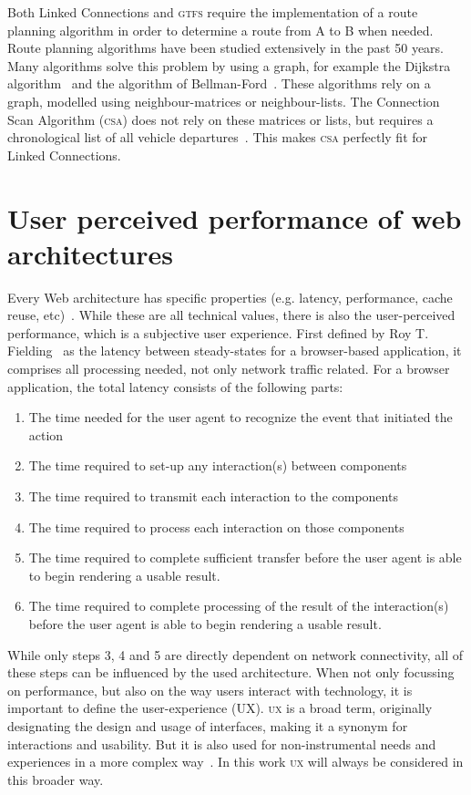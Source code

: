 \documentclass[twocolumn]{phdsymp} %
\begin{document}
Both Linked Connections and \textsc{gtfs} require the implementation of a route planning algorithm in order to determine a route from A to B when needed. Route planning algorithms have been studied extensively in the past 50 years. Many algorithms solve this problem by using a graph, for example the Dijkstra algorithm~\cite{dijkstra} and the algorithm of Bellman-Ford~\cite{bellmanford}. These algorithms rely on a graph, modelled using neighbour-matrices or neighbour-lists. The Connection Scan Algorithm (\textsc{csa}) does not rely on these matrices or lists, but requires a chronological list of all vehicle departures~\cite{csa}. This makes \textsc{csa} perfectly fit for Linked Connections.

\section{User perceived performance of web architectures}
Every Web architecture has specific properties (e.g. latency, performance, cache reuse, etc)~\cite{verborgh16}. While these are all technical values, there is also the user-perceived performance, which is a subjective user experience. First defined by Roy T. Fielding~\cite{fielding99} as the latency between steady-states for a browser-based application, it comprises all processing needed, not only network traffic related. For a browser application, the total latency consists of the following parts:
\begin{enumerate}
	\item The time needed for the user agent to recognize the event that initiated the action
	\item The time required to set-up any interaction(s) between components
	\item The time required to transmit each interaction to the components
	\item The time required to process each interaction on those components
	\item The time required to complete sufficient transfer before the user agent is able to begin rendering a usable result.
	\item The time required to complete processing of the result of the interaction(s) before the user agent is able to begin rendering a usable result.
\end{enumerate}

While only steps 3, 4 and 5 are directly dependent on network connectivity, all of these steps can be influenced by the used architecture. When not only focussing on performance, but also on the way users interact with technology, it is important to define the user-experience (UX). \textsc{ux} is a broad term, originally designating the design and usage of interfaces, making it a synonym for interactions and usability. But it is also used for non-instrumental needs and experiences in a more complex way~\cite{avila11}. In this work \textsc{ux} will always be considered in this broader way.
\end{document}
